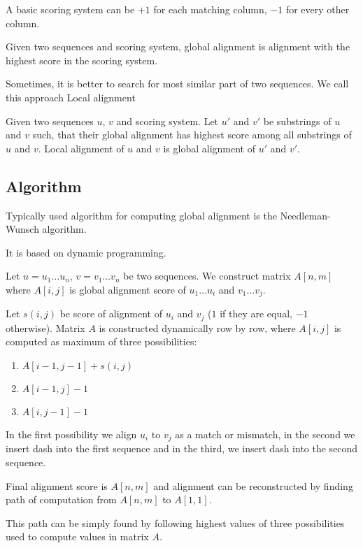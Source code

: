 A basic scoring system can be $+1$ for each matching column, $-1$ for every other column.

\begin{definition}
Given two sequences and scoring system, global alignment is alignment with the highest score in the scoring system.
\end{definition}

Sometimes, it is better to search for most similar part of two sequences. We call this approach Local alignment

\begin{definition}
Given two sequences $u$, $v$ and scoring system. Let $u'$ and $v'$ be substrings of $u$ and $v$ such, that their global alignment has highest score among all substrings of $u$ and $v$. Local alignment of $u$ and $v$ is global alignment of $u'$ and $v'$.
\end{definition}

\subsection{Algorithm}
Typically used algorithm for computing global alignment is the Needleman-Wunsch algorithm.

It is based on dynamic programming. 

Let $u=u_1 \dots u_n$, $v=v_1 \dots v_n$ be two sequences. We construct matrix $A[n,m]$ where $A[i,j]$ is global alignment score of $u_1 \dots u_i$ and $v_1 \dots v_j$.

Let $s(i,j)$ be score of alignment of $u_i$ and $v_j$ ($1$ if they are equal, $-1$ otherwise).
Matrix $A$ is constructed dynamically row by row, where $A[i,j]$ is computed as maximum of three possibilities:
\begin{enumerate}
\item $A[i-1,j-1]+s(i,j)$
\item $A[i-1,j]-1$
\item $A[i,j-1]-1$
\end{enumerate}

In the first possibility we align $u_i$ to $v_j$ as a match or mismatch, in the second we insert dash into the first sequence and in the third, we insert dash into the second sequence.

Final alignment score is $A[n,m]$ and alignment can be reconstructed by finding path of computation from $A[n,m]$ to $A[1,1]$.

This path can be simply found by following highest values of three possibilities used to compute values in matrix $A$. 


